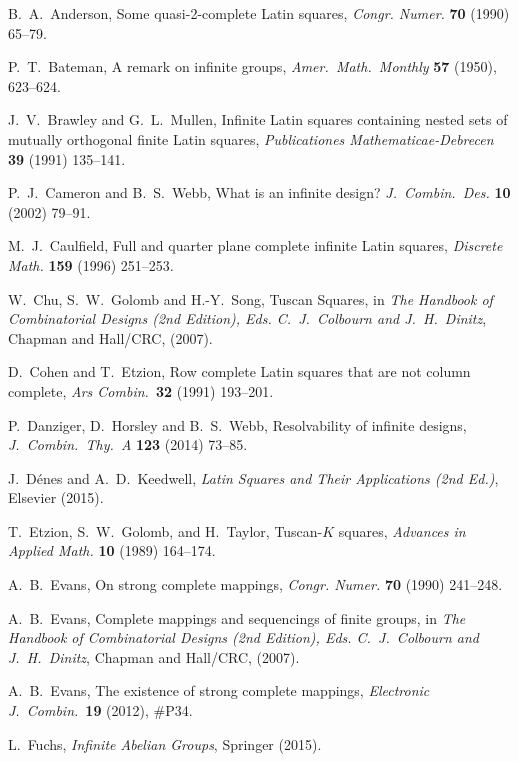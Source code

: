 \documentclass[12pt,a4paper]{article}
\begin{document}
\begin{thebibliography}{99}


B.~A.~Anderson, Some quasi-2-complete Latin squares, {\em Congr. Numer.} {\bf 70} (1990) 65--79.

P.~T.~Bateman, A remark on infinite groups, {\em Amer.~Math.~Monthly} {\bf 57} (1950), 623--624.

J.~V.~Brawley and G.~L.~Mullen, Infinite Latin squares containing nested sets of mutually orthogonal finite Latin squares, {\em Publicationes Mathematicae-Debrecen} {\bf 39} (1991) 135--141.


P.~J.~Cameron and B.~S.~Webb, What is an infinite design? {\em J.~Combin.~Des.} {\bf 10} (2002) 79--91.

M.~J.~Caulfield, Full and quarter plane complete infinite Latin squares, {\em Discrete Math.} {\bf 159} (1996) 251--253.

W.~Chu, S.~W.~Golomb and H.-Y.~Song, Tuscan Squares, in {\em The Handbook of Combinatorial Designs (2nd Edition), Eds. C.~J.~Colbourn and J.~H.~Dinitz}, Chapman and Hall/CRC, (2007).

D.~Cohen and T.~Etzion, Row complete Latin squares that are not column complete, {\em Ars Combin.}~{\bf 32} (1991) 193--201.

P.~Danziger, D.~Horsley and B.~S.~Webb, Resolvability of infinite designs, {\em J.~Combin.~Thy.~A} {\bf 123} (2014) 73--85.

J.~D{\'e}nes and A.~D.~Keedwell, {\em Latin Squares and Their Applications (2nd Ed.)}, Elsevier (2015).

T.~Etzion, S.~W.~Golomb, and H.~Taylor, Tuscan-$K$ squares, {\em Advances in Applied Math.} {\bf 10} (1989) 164--174.


A.~B.~Evans, On strong complete mappings, {\em Congr. Numer.} {\bf 70} (1990) 241--248.


A.~B.~Evans, 
Complete mappings and sequencings of finite groups, in {\em The Handbook of Combinatorial Designs (2nd Edition), Eds. C.~J.~Colbourn and J.~H.~Dinitz}, Chapman and Hall/CRC, (2007).

A.~B.~Evans, The existence of strong complete mappings, {\em Electronic J.~Combin.}~{\bf 19} (2012), \#P34.


L.~Fuchs, {\em Infinite Abelian Groups}, Springer (2015).


\end{thebibliography}
\end{document}
